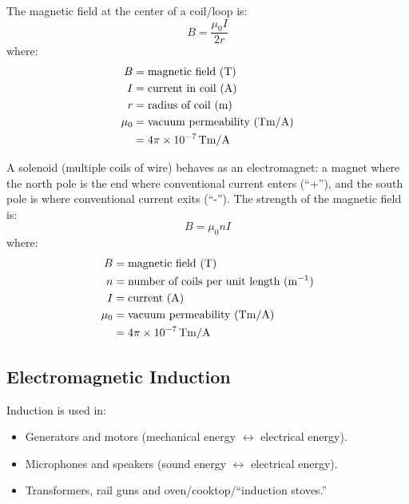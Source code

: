 \documentclass{article}
\newcommand{\theorem}[2]{\begin{tcolorbox}[title={#1},colback=blue!5!white,colframe=blue!75!black,parbox=false] #2 \end{tcolorbox}}
\begin{document}
\theorem{Magnetic field at center of current-carrying coils}{
	The magnetic field at the center of a coil/loop is:
	\begin{equation*}
	    B=\frac{\mu_0I}{2r}
	\end{equation*}
	where:
	\begin{align*}
		B&=\text{magnetic field (T)} \\
		I&=\text{current in coil (A)} \\
		r&=\text{radius of coil (m)} \\
		\mu_0&=\text{vacuum permeability (\si{Tm/A})} \\
			 &=4\pi\times 10^{-7}\,\si{Tm/A}
	\end{align*}
}

\theorem{Solenoid}{
	A solenoid (multiple coils of wire) behaves as an electromagnet: a magnet where the north pole is the end where conventional current enters (``+''), and the south pole is where conventional current exits (``-''). The strength of the magnetic field is:
	\begin{equation*}
	    B=\mu_0 nI
	\end{equation*}
	where:
	\begin{align*}
		B&=\text{magnetic field (T)} \\
		n&=\text{number of coils per unit length (\si{m^{-1}})} \\
		I&=\text{current (A)} \\
		\mu_0&=\text{vacuum permeability (\si{Tm/A})} \\
			 &=4\pi\times 10^{-7}\,\si{Tm/A}
	\end{align*}
}

\subsection{Electromagnetic Induction}

Induction is used in:
\begin{itemize}
	\item Generators and motors (mechanical energy $\longleftrightarrow$ electrical energy).
	\item Microphones and speakers (sound energy $\longleftrightarrow$ electrical energy).
	\item Transformers, rail guns and oven/cooktop/``induction stoves.''
\end{itemize}
\end{document}
